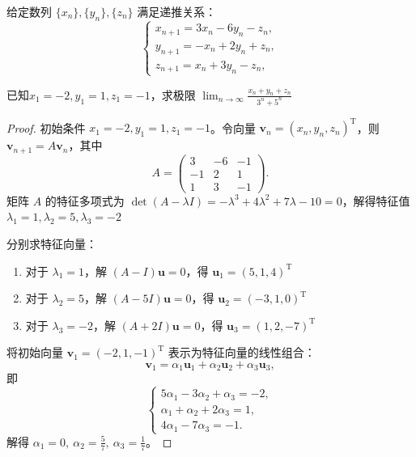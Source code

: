 \begin{example}[\label{三阶递推}]
给定数列 \(\{x_n\}, \{y_n\}, \{z_n\}\) 满足递推关系：
\[
\begin{cases}
x_{n+1} = 3x_n - 6y_n - z_n, \\
y_{n+1} = -x_n + 2y_n + z_n, \\
z_{n+1} = x_n + 3y_n - z_n,
\end{cases}\]

已知\(x_1 = -2, y_1 = 1, z_1 = -1\)，求极限 $ \displaystyle \lim_{n \to \infty} \frac{x_n + y_n + z_n}{3^n + 5^n} $
\end{example}

\begin{proof}
初始条件 \(x_1 = -2, y_1 = 1, z_1 = -1\)。令向量 \(\mathbf{v}_n = (x_n, y_n, z_n)^\mathrm{T}\)，则 \(\mathbf{v}_{n+1} = A \mathbf{v}_n\)，其中
\[
A = \begin{pmatrix}
3 & -6 & -1 \\
-1 & 2 & 1 \\
1 & 3 & -1
\end{pmatrix}.
\]
矩阵 \(A\) 的特征多项式为 \(\det(A - \lambda I) = -\lambda^3 + 4\lambda^2 + 7\lambda - 10 = 0\)，解得特征值 \(\lambda_1 = 1, \lambda_2 = 5, \lambda_3 = -2\)

分别求特征向量： 
\begin{enumerate}
\item 对于 \(\lambda_1 = 1\)，解 \((A - I)\mathbf{u} = 0\)，得 \(\mathbf{u}_1 = (5, 1, 4)^\mathrm{T}\)
\item 对于 \(\lambda_2 = 5\)，解 \((A - 5I)\mathbf{u} = 0\)，得 \(\mathbf{u}_2 = (-3, 1, 0)^\mathrm{T}\)
\item 对于 \(\lambda_3 = -2\)，解 \((A + 2I)\mathbf{u} = 0\)，得 \(\mathbf{u}_3 = (1, 2, -7)^\mathrm{T}\)
\end{enumerate} 
 
将初始向量 \(\mathbf{v}_1 = (-2, 1, -1)^\mathrm{T}\) 表示为特征向量的线性组合：  
\[
\mathbf{v}_1 = \alpha_1 \mathbf{u}_1 + \alpha_2 \mathbf{u}_2 + \alpha_3 \mathbf{u}_3,
\]  
即  
\[
\begin{cases}
5\alpha_1 - 3\alpha_2 + \alpha_3 = -2, \\
\alpha_1 + \alpha_2 + 2\alpha_3 = 1, \\
4\alpha_1 - 7\alpha_3 = -1.
\end{cases}
\]  
解得 \(\alpha_1 = 0,\ \alpha_2 = \frac{5}{7},\ \alpha_3 = \frac{1}{7}\)。  


\end{proof}
